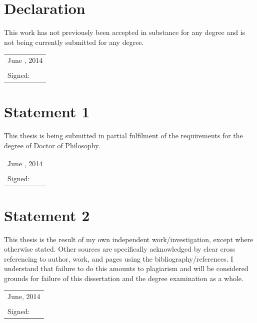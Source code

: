 \documentclass[11pt, a4paper, twoside, openright]{book}
\begin{document}
\thispagestyle{empty}

\newpage
\thispagestyle{empty}

\mbox{}

\clearpage



\thispagestyle{empty}

\section*{Declaration}

This work has not previously been accepted in substance for any degree
and is not being currently submitted for any degree.

\vspace{0.5cm}
\begin{tabular}{l}
June , 2014\\
\\
Signed:
\end{tabular}

\section*{Statement 1}
This thesis is being submitted in partial fulfilment of the
requirements for the degree of Doctor of Philosophy.

\vspace{0.5cm}
\begin{tabular}{l}
June , 2014\\
\\
Signed:
\end{tabular}

\section*{Statement 2}

This thesis is the result of my own independent
work/investigation, except where otherwise stated. Other sources are
specifically acknowledged by clear cross referencing to author, work,
and pages using the bibliography/references. I understand that failure
to do this amounts to plagiarism and will be considered grounds for
failure of this dissertation and the degree examination as a whole.

\vspace{0.5cm}
\begin{tabular}{l}
June, 2014\\
\\
Signed:
\end{tabular}
\end{document}
